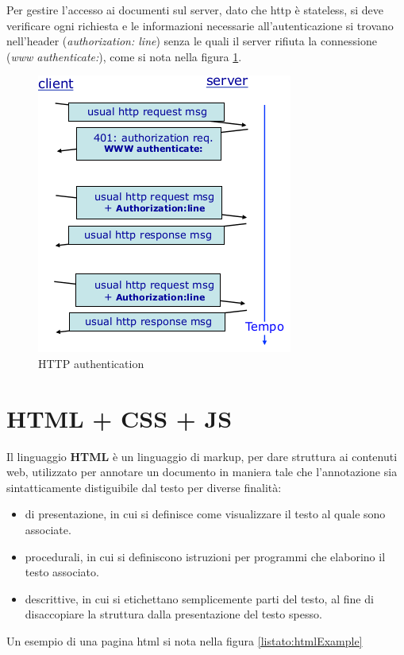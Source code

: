 \documentclass[a4paper,12pt, oneside]{book}
\begin{document}
Per gestire l'accesso ai documenti sul server, dato che http è stateless, si deve verificare ogni richiesta 
e le informazioni necessarie all'autenticazione si trovano nell'header (\textit{authorization: line}) 
senza le quali il server rifiuta la connessione (\textit{www authenticate:}), come si nota 
nella figura \ref{img:authentication}.
\begin{figure}
    \caption{HTTP authentication}
    \label{img:authentication}
	\includegraphics[scale=0.7]{img/http6.png}
\end{figure}

\chapter{HTML + CSS + JS}
Il linguaggio \textbf{HTML} è un linguaggio di markup, per dare struttura ai contenuti web,
utilizzato per annotare un documento in maniera tale che l'annotazione sia sintatticamente
distiguibile dal testo per diverse finalità:
\begin{itemize}
    \item di presentazione, in cui si definisce come visualizzare il testo al quale sono associate.
    \item procedurali, in cui si definiscono istruzioni per programmi che elaborino il testo associato.
    \item descrittive, in cui si etichettano semplicemente parti del testo, 
        al fine di disaccopiare la struttura dalla presentazione del testo spesso.
\end{itemize}
Un esempio di una pagina html si nota nella figura \ref{listato:htmlExample}
\end{document}
